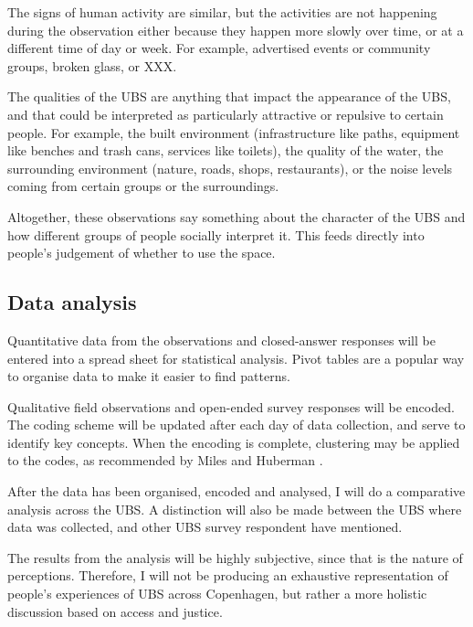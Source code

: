 \documentclass{article}
\begin{document}
The signs of human activity are similar, but the activities are not happening during the observation either because they happen more slowly over time, or at a different time of day or week. For example, advertised events or community groups, broken glass, or XXX.

The qualities of the UBS are anything that impact the appearance of the UBS, and that could be interpreted as particularly attractive or repulsive to certain people.
For example, the built environment (infrastructure like paths, equipment like benches and trash cans, services like toilets), the quality of the water, the surrounding environment (nature, roads, shops, restaurants), or the noise levels coming from certain groups or the surroundings.

Altogether, these observations say something about the character of the UBS and how different groups of people socially interpret it. This feeds directly into people's judgement of whether to use the space.

\subsection{Data analysis}

Quantitative data from the observations and closed-answer responses will be entered into a spread sheet for statistical analysis. Pivot tables are a popular way to organise data to make it easier to find patterns.

Qualitative field observations and open-ended survey responses will be encoded. The coding scheme will be updated after each day of data collection, and serve to identify key concepts. When the encoding is complete, clustering may be applied to the codes, as recommended by Miles and Huberman \parencite{miles1994qualitative}.

After the data has been organised, encoded and analysed, I will do a comparative analysis across the UBS. A distinction will also be made between the UBS where data was collected, and other UBS  survey respondent have mentioned. 


The results from the analysis will be highly subjective, since that is the nature of perceptions. Therefore, I will not be producing an exhaustive representation of people's experiences of UBS across Copenhagen, but rather a more holistic discussion based on access and justice.
\end{document}
